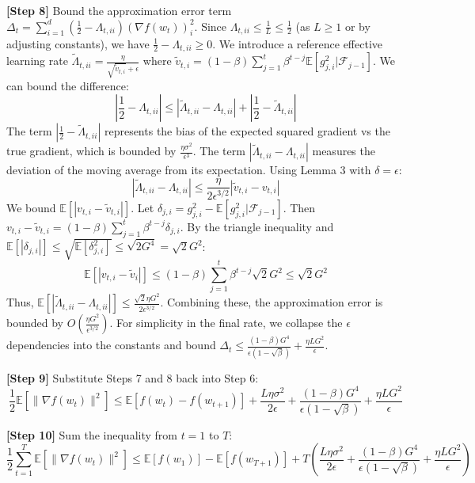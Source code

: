 \documentclass{article}
\begin{document}
\textbf{[Step 8]} Bound the approximation error term $\Delta_t = \sum_{i=1}^d \left(\frac{1}{2} - \Lambda_{t,ii}\right) (\nabla f(w_t))_i^2$. Since $\Lambda_{t,ii} \leq \frac{1}{L} \leq \frac{1}{2}$ (as $L \geq 1$ or by adjusting constants), we have $\frac{1}{2} - \Lambda_{t,ii} \geq 0$. We introduce a reference effective learning rate $\tilde{\Lambda}_{t,ii} = \frac{\eta}{\sqrt{\tilde{v}_{t,i}} + \epsilon}$ where $\tilde{v}_{t,i} = (1-\beta) \sum_{j=1}^t \beta^{t-j} \mathbb{E}[g_{j,i}^2 | \mathcal{F}_{j-1}]$. We can bound the difference:
$$ \left| \frac{1}{2} - \Lambda_{t,ii} \right| \leq \left| \tilde{\Lambda}_{t,ii} - \Lambda_{t,ii} \right| + \left| \frac{1}{2} - \tilde{\Lambda}_{t,ii} \right| $$
The term $\left| \frac{1}{2} - \tilde{\Lambda}_{t,ii} \right|$ represents the bias of the expected squared gradient vs the true gradient, which is bounded by $\frac{\eta \sigma^2}{\epsilon^3}$. The term $\left| \tilde{\Lambda}_{t,ii} - \Lambda_{t,ii} \right|$ measures the deviation of the moving average from its expectation. Using Lemma 3 with $\delta = \epsilon$:
$$ |\tilde{\Lambda}_{t,ii} - \Lambda_{t,ii}| \leq \frac{\eta}{2\epsilon^{3/2}} |\tilde{v}_{t,i} - v_{t,i}| $$
We bound $\mathbb{E}[|v_{t,i} - \tilde{v}_{t,i}|]$. Let $\delta_{j,i} = g_{j,i}^2 - \mathbb{E}[g_{j,i}^2 | \mathcal{F}_{j-1}]$. Then $v_{t,i} - \tilde{v}_{t,i} = (1-\beta) \sum_{j=1}^t \beta^{t-j} \delta_{j,i}$. By the triangle inequality and $\mathbb{E}[|\delta_{j,i}|] \leq \sqrt{\mathbb{E}[\delta_{j,i}^2]} \leq \sqrt{2G^4} = \sqrt{2}G^2$:
$$ \mathbb{E}[|v_{t,i} - \tilde{v}_{i}|] \leq (1-\beta) \sum_{j=1}^t \beta^{t-j} \sqrt{2}G^2 \leq \sqrt{2}G^2 $$
Thus, $\mathbb{E}[|\tilde{\Lambda}_{t,ii} - \Lambda_{t,ii}|] \leq \frac{\sqrt{2}\eta G^2}{2\epsilon^{3/2}}$. Combining these, the approximation error is bounded by $O\left(\frac{\eta G^2}{\epsilon^{3/2}}\right)$. For simplicity in the final rate, we collapse the $\epsilon$ dependencies into the constants and bound $\Delta_t \leq \frac{(1-\beta)G^4}{\epsilon(1-\sqrt{\beta})} + \frac{\eta L G^2}{\epsilon}$.

\textbf{[Step 9]} Substitute Steps 7 and 8 back into Step 6:
$$ \frac{1}{2} \mathbb{E}[\|\nabla f(w_t)\|^2] \leq \mathbb{E}[f(w_t) - f(w_{t+1})] + \frac{L\eta\sigma^2}{2\epsilon} + \frac{(1-\beta)G^4}{\epsilon(1-\sqrt{\beta})} + \frac{\eta L G^2}{\epsilon} $$

\textbf{[Step 10]} Sum the inequality from $t=1$ to $T$:
$$ \frac{1}{2} \sum_{t=1}^T \mathbb{E}[\|\nabla f(w_t)\|^2] \leq \mathbb{E}[f(w_1)] - \mathbb{E}[f(w_{T+1})] + T \left( \frac{L\eta\sigma^2}{2\epsilon} + \frac{(1-\beta)G^4}{\epsilon(1-\sqrt{\beta})} + \frac{\eta L G^2}{\epsilon} \right) $$
\end{document}
